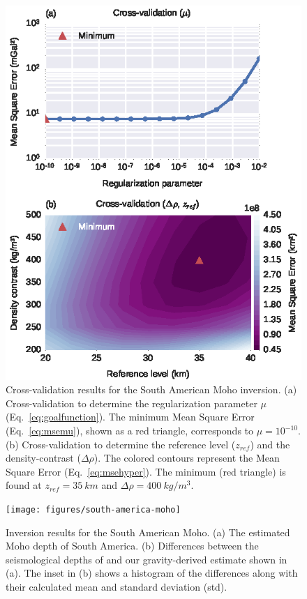 \documentclass[extra]{gji}
\begin{document}
\begin{figure}
    \centering
    \includegraphics{figures/south-america-cv}
    \caption{
        Cross-validation results for the South American Moho inversion.
        (a) Cross-validation to determine the regularization parameter $\mu$
        (Eq.~\ref{eq:goalfunction}).
        The minimum Mean Square Error (Eq.~\ref{eq:msemu}),
        shown as a red triangle,
        corresponds to $\mu = 10^{-10}$.
        (b) Cross-validation to determine
        the reference level ($z_{ref}$) and the density-contrast ($\Delta\rho$).
        The colored contours represent
        the Mean Square Error (Eq.~\ref{eq:msehyper}).
        The minimum (red triangle) is found at $z_{ref} = 35\ km$
        and $\Delta\rho = 400\ kg/m^3$.
    }
    \label{fig:sam-cv}
\end{figure}

\begin{figure}
    \centering
    \texttt{[image: figures/south-america-moho]}
    \caption{
        Inversion results for the South American Moho.
        (a) The estimated Moho depth of South America.
        (b) Differences between the seismological depths of
        \citet{assumpcao2012} and our gravity-derived estimate shown in (a).
        The inset in (b) shows a histogram of the differences along with their
        calculated mean and standard deviation (std).
    }
    \label{fig:sam-moho}
\end{figure}
\end{document}
